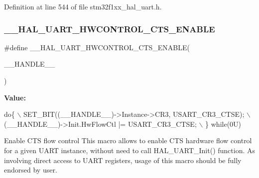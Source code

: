 Definition at line 544 of file stm32f1xx\+\_\+hal\+\_\+uart.\+h.

\mbox{\label{group___u_a_r_t___exported___macros_ga4a77213945844bca4c22ba6a14b7ee4c}} 
\subsubsection{\texorpdfstring{\+\_\+\+\_\+\+H\+A\+L\+\_\+\+U\+A\+R\+T\+\_\+\+H\+W\+C\+O\+N\+T\+R\+O\+L\+\_\+\+C\+T\+S\+\_\+\+E\+N\+A\+B\+LE}{\_\_HAL\_UART\_HWCONTROL\_CTS\_ENABLE}}
{\footnotesize\ttfamily \#define \+\_\+\+\_\+\+H\+A\+L\+\_\+\+U\+A\+R\+T\+\_\+\+H\+W\+C\+O\+N\+T\+R\+O\+L\+\_\+\+C\+T\+S\+\_\+\+E\+N\+A\+B\+LE(\begin{DoxyParamCaption}\item[{}]{\+\_\+\+\_\+\+H\+A\+N\+D\+L\+E\+\_\+\+\_\+ }\end{DoxyParamCaption})}

{\bfseries Value\+:}
\begin{DoxyCode}
\textcolor{keywordflow}{do}\{                                                      \(\backslash\)
    SET\_BIT((\_\_HANDLE\_\_)->Instance->CR3, USART\_CR3\_CTSE);  \(\backslash\)
    (\_\_HANDLE\_\_)->Init.HwFlowCtl |= USART\_CR3\_CTSE;        \(\backslash\)
  \} \textcolor{keywordflow}{while}(0U)
\end{DoxyCode}


Enable C\+TS flow control This macro allows to enable C\+TS hardware flow control for a given U\+A\+RT instance, without need to call H\+A\+L\+\_\+\+U\+A\+R\+T\+\_\+\+Init() function. As involving direct access to U\+A\+RT registers, usage of this macro should be fully endorsed by user. 


